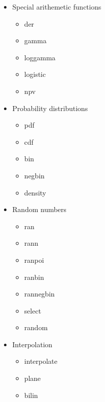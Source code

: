 \begin{itemize}
\item  Special arithemetic functions
\begin{itemize}
\item der
\item gamma
\item loggamma
\item logistic
\item npv
\end{itemize}

\item  Probability distributions
\begin{itemize}
\item pdf
\item cdf
\item bin
\item negbin
\item density
\end{itemize}
\item Random numbers
\begin{itemize}
\item ran
\item rann
\item ranpoi
\item ranbin
\item rannegbin
\item select
\item random
\end{itemize}
\item Interpolation
\begin{itemize}
\item interpolate
\item plane
\item bilin
\end{itemize}


\end{itemize}
